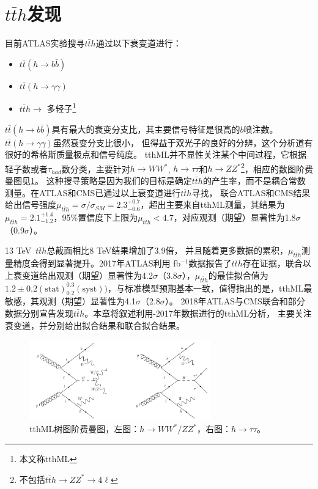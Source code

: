 \section{$t\bar{t}h$发现}
目前ATLAS实验搜寻$t\bar{t}h$通过以下衰变道进行：
\begin{itemize}
 \item $t\bar{t}(h\rightarrow b\bar{b})$
 \item $t\bar{t}(h\rightarrow \gamma\gamma)$
 \item $t\bar{t}h\rightarrow$ 多轻子\footnote{本文称tthML}
\end{itemize}
$t\bar{t}(h\rightarrow b\bar{b})$具有最大的衰变分支比，其主要信号特征是很高的$b$喷注数。$t\bar{t}(h\rightarrow \gamma\gamma)$虽然衰变分支比很小，
但得益于双光子的良好的分辨，这个分析道有很好的希格斯质量极点和信号纯度。
tthML并不显性关注某个中间过程，它根据轻子数或者$\tau_{had}$数分类，主要针对$h\rightarrow WW^*$, $h\rightarrow \tau\tau$和$h\rightarrow ZZ^*$\footnote{不包括$t\bar{t}h\rightarrow ZZ^*\rightarrow 4\ell$}，相应的数图阶费曼图见\ref{fig:diagram_tthML_LO}。
这种搜寻策略是因为我们的目标是确定$t\bar{t}h$的产生率，而不是耦合常数测量。在\RunOne ATLAS和CMS已通过以上衰变道进行$t\bar{t}h$寻找\cite{Aad:2015iha,Aad:2015gra,Aad:2014lma,Khachatryan:2014qaa,Khachatryan:2015ila,Khachatryan:2016vau}，
联合ATLAS和CMS结果给出信号强度$\mu_{t\bar{t}h}=\sigma/\sigma_{SM}=2.3^{+0.7}_{-0.6}$，超出主要来自tthML测量，其结果为$\mu_{t\bar{t}h}=2.1^{+1.4}_{-1.2}$，95\%置信度下上限为$\mu_{t\bar{t}h}<4.7$，对应观测（期望）显著性为1.8$\sigma$（0.9$\sigma$）。

13 TeV~$t\bar{t}h$总截面相比8 TeV结果增加了3.9倍\cite{Heinemeyer:2013tqa,XSWG13TeV}，
并且随着更多数据的累积，$\mu_{t\bar{t}h}$测量精度会得到显著提升。2017年ATLAS利用 fb$^{-1}$数据报告了$t\bar{t}h$存在证据\cite{Aaboud:2017jvq}，联合以上衰变道给出观测（期望）显著性为4.2$\sigma$（3.8$\sigma$），$\mu_{t\bar{t}h}$的最佳拟合值为$1.2\pm0.2(\text{stat})^{0.3}_{0.2}(\text{syst}))$，与标准模型预期基本一致，值得指出的是，tthML最敏感，其观测（期望）显著性为4.1$\sigma$（2.8$\sigma$）。
2018年ATLAS与CMS联合\RunOne 和\RunTwo 部分数据分别宣告发现$t\bar{t}h$\cite{Aaboud:2018urx,PhysRevLett.120.231801}。本章将叙述利用-2017年数据进行的tthML分析，
主要关注\ltwotau 衰变道，并分别给出\ltwotau 拟合结果和联合拟合结果。
\begin{figure}[h]
\centering
 \includegraphics[width=0.7\textwidth]{fig/diagram_tth_LO.png}
 \caption{tthML树图阶费曼图，左图：$h\rightarrow WW^*/ZZ^*$，右图：$h\rightarrow \tau\tau$。}
 \label{fig:diagram_tthML_LO}
\end{figure}

